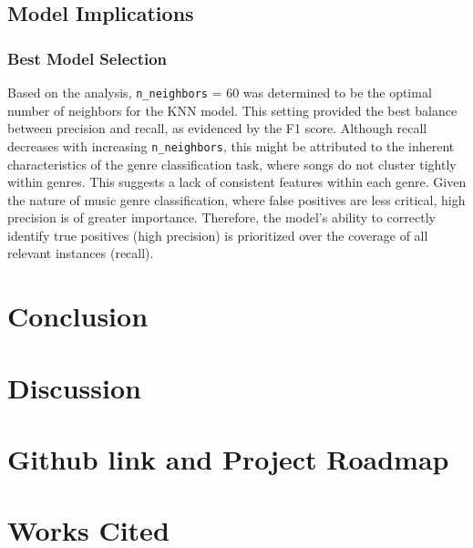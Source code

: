 \documentclass[times, twocolumn]{article}
\begin{document}
\subsection{Model Implications}
\subsubsection{Best Model Selection}
Based on the analysis, \verb|n_neighbors| = 60 was determined to be the optimal number of neighbors for the KNN model. This setting provided the best balance between precision and recall, as evidenced by the F1 score. Although recall decreases with increasing \verb|n_neighbors|, this might be attributed to the inherent characteristics of the genre classification task, where songs do not cluster tightly within genres. This suggests a lack of consistent features within each genre. Given the nature of music genre classification, where false positives are less critical, high precision is of greater importance. Therefore, the model's ability to correctly identify true positives (high precision) is prioritized over the coverage of all relevant instances (recall).

\section{Conclusion}

\section{Discussion}

\section{Github link and Project Roadmap}

\section{Works Cited}
\printbibliography
\end{document}
